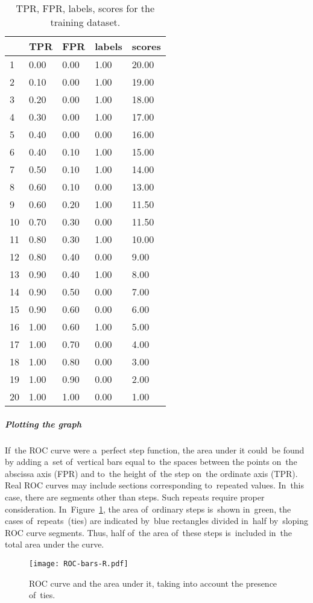 \documentclass[]{scrreprt}
\begin{document}
\begin{table}[htp]
	\caption{TPR, FPR, labels, scores for the training dataset.}\label{tab:roc_df-r}
	\centering
	\begin{tabular}{lllll}
		\hline
		& TPR & FPR & labels & scores \\ 
		\hline
		1 & 0.00 & 0.00 & 1.00 & 20.00 \\ 
		2 & 0.10 & 0.00 & 1.00 & 19.00 \\ 
		3 & 0.20 & 0.00 & 1.00 & 18.00 \\ 
		4 & 0.30 & 0.00 & 1.00 & 17.00 \\ 
		5 & 0.40 & 0.00 & 0.00 & 16.00 \\ 
		6 & 0.40 & 0.10 & 1.00 & 15.00 \\ 
		7 & 0.50 & 0.10 & 1.00 & 14.00 \\ 
		8 & 0.60 & 0.10 & 0.00 & 13.00 \\ 
		9 & 0.60 & 0.20 & 1.00 & 11.50 \\ 
		10 & 0.70 & 0.30 & 0.00 & 11.50 \\ 
		11 & 0.80 & 0.30 & 1.00 & 10.00 \\ 
		12 & 0.80 & 0.40 & 0.00 & 9.00 \\ 
		13 & 0.90 & 0.40 & 1.00 & 8.00 \\ 
		14 & 0.90 & 0.50 & 0.00 & 7.00 \\ 
		15 & 0.90 & 0.60 & 0.00 & 6.00 \\ 
		16 & 1.00 & 0.60 & 1.00 & 5.00 \\ 
		17 & 1.00 & 0.70 & 0.00 & 4.00 \\ 
		18 & 1.00 & 0.80 & 0.00 & 3.00 \\ 
		19 & 1.00 & 0.90 & 0.00 & 2.00 \\ 
		20 & 1.00 & 1.00 & 0.00 & 1.00 \\ 
		\hline
	\end{tabular}
\end{table}
%
\subparagraph{Plotting the graph}
If~the ROC curve were a~perfect step function, the area under it could~be found by adding a~set of~vertical bars equal to~the spaces between the points on~the abscissa axis (FPR) and to~the height of~the step on~the ordinate axis (TPR). Real ROC curves may include sections corresponding to~repeated values. In~this case, there are segments other than steps. Such repeats require proper consideration. In~Figure~\ref{fig:ROC-bars-R}, the area of~ordinary steps is~shown in~green, the cases of~repeats~(ties) are indicated by~blue rectangles divided in~half by~sloping ROC curve segments. Thus, half of~the area of~these steps is~included in~the total area under the curve.
%
\begin{figure}[htp]
	\centering
	\texttt{[image: ROC-bars-R.pdf]}
	\caption{ROC curve and the area under it, taking into account the presence of~ties.}
	\label{fig:ROC-bars-R}
\end{figure}
\end{document}
